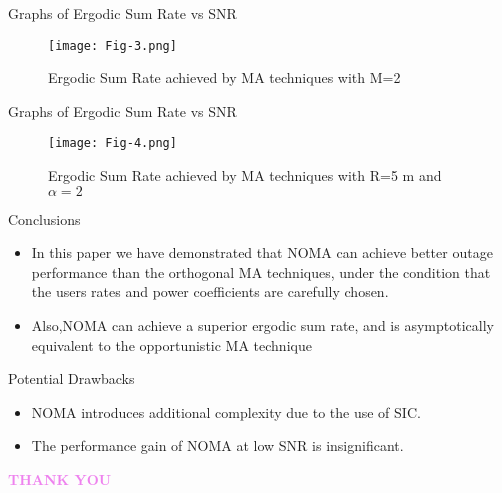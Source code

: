 \documentclass{beamer}
\begin{document}
               \begin{frame}{Graphs of Ergodic Sum Rate vs SNR}
       
            \begin{figure}[ht]
    \centering
    \texttt{[image: Fig-3.png]}
    \caption{Ergodic Sum Rate achieved by MA techniques with M=2}
    \label{Ergodic vs SNR 1}
\end{figure}
        \end{frame}        \begin{frame}{Graphs of Ergodic Sum Rate vs SNR}
       
            \begin{figure}[ht]
    \centering
    \texttt{[image: Fig-4.png]}
    \caption{Ergodic Sum Rate achieved by MA techniques with R=5 m and $\alpha=2$}
    \label{Ergodic vs SNR 2}
\end{figure}
        \end{frame}
        \begin{frame}
            \begin{block}{Conclusions}
            \begin{itemize}
                \item In this paper we have demonstrated that NOMA can achieve better outage performance than the orthogonal MA
                  techniques, under the condition that the users rates and power
          coefficients are carefully chosen.
          \item Also,NOMA can achieve a superior ergodic sum rate, and is asymptotically equivalent to the opportunistic MA technique
            \end{itemize}
            \end{block}
            \begin{block}{Potential Drawbacks}
            \begin{itemize}
                \item NOMA introduces additional complexity due to the use of SIC.
                \item The performance gain of NOMA at low SNR is insignificant.
            \end{itemize}
            \end{block}
        \end{frame}
        \begin{frame}
   \centering
    \textcolor{violet}{\Huge{\textbf{THANK YOU}}}
 \begin{figure}
    \label{logo}
\end{figure}
\end{frame}
\end{document}
